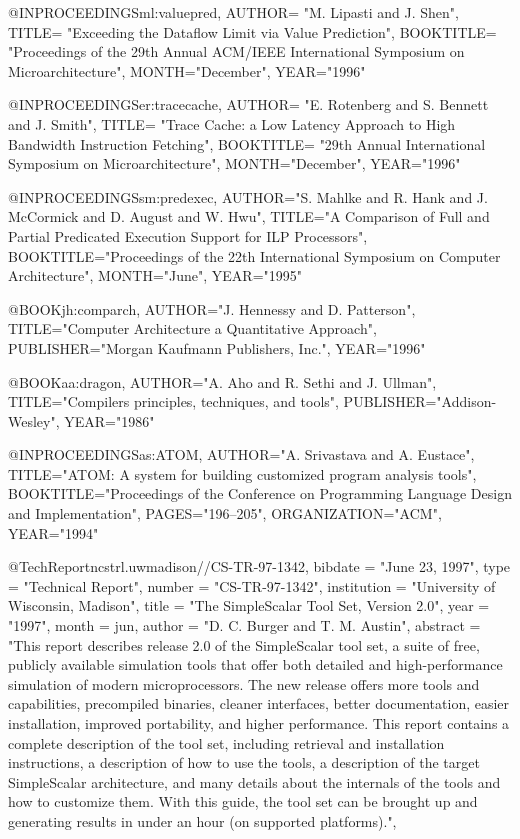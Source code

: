 @INPROCEEDINGS{ml:valuepred,
AUTHOR= "M. Lipasti and J. Shen", 
TITLE= "Exceeding the Dataflow Limit via Value Prediction",
BOOKTITLE= "Proceedings of the 29th Annual ACM/IEEE International Symposium on Microarchitecture", 
MONTH="December",
YEAR="1996"}

@INPROCEEDINGS{er:tracecache,
AUTHOR= "E. Rotenberg and S. Bennett and J. Smith", 
TITLE= "Trace Cache: a Low Latency Approach to High Bandwidth Instruction Fetching",
BOOKTITLE= "29th Annual International Symposium on Microarchitecture", 
MONTH="December",
YEAR="1996"}

@INPROCEEDINGS{sm:predexec,
AUTHOR="S. Mahlke and R. Hank and J. McCormick and D. August and W. Hwu", 
TITLE="A Comparison of Full and Partial Predicated Execution Support for ILP Processors", 
BOOKTITLE="Proceedings of the 22th International Symposium on Computer Architecture", 
MONTH="June",
YEAR="1995"} 

@BOOK{jh:comparch,
AUTHOR="J. Hennessy and D. Patterson",
TITLE="Computer Architecture a Quantitative Approach",
PUBLISHER="{Morgan Kaufmann Publishers, Inc.}",
YEAR="1996"}

@BOOK{aa:dragon,
AUTHOR="A. Aho and R. Sethi and J. Ullman",
TITLE="{Compilers principles, techniques, and tools}",
PUBLISHER="{Addison-Wesley}",
YEAR="1986"}

@INPROCEEDINGS{as:ATOM,
AUTHOR="A. Srivastava and A. Eustace",
TITLE="ATOM: A system for building customized program analysis tools",
BOOKTITLE="Proceedings of the Conference on Programming Language Design and Implementation",
PAGES="196--205",
ORGANIZATION="ACM",
YEAR="1994"}




@TechReport{ncstrl.uwmadison//CS-TR-97-1342,
  bibdate =      "June 23, 1997",
  type =         "Technical Report",
  number =       "CS-TR-97-1342",
  institution =  "University of Wisconsin, Madison",
  title =        "The SimpleScalar Tool Set, Version 2.0",
  year =         "1997",
  month =        jun,
  author =       "D. C. Burger and T. M. Austin",
  abstract =     "This report describes release 2.0 of the SimpleScalar
                 tool set, a suite of free, publicly available
                 simulation tools that offer both detailed and
                 high-performance simulation of modern microprocessors.
                 The new release offers more tools and capabilities,
                 precompiled binaries, cleaner interfaces, better
                 documentation, easier installation, improved
                 portability, and higher performance. This report
                 contains a complete description of the tool set,
                 including retrieval and installation instructions, a
                 description of how to use the tools, a description of
                 the target SimpleScalar architecture, and many details
                 about the internals of the tools and how to customize
                 them. With this guide, the tool set can be brought up
                 and generating results in under an hour (on supported
                 platforms).",
}



